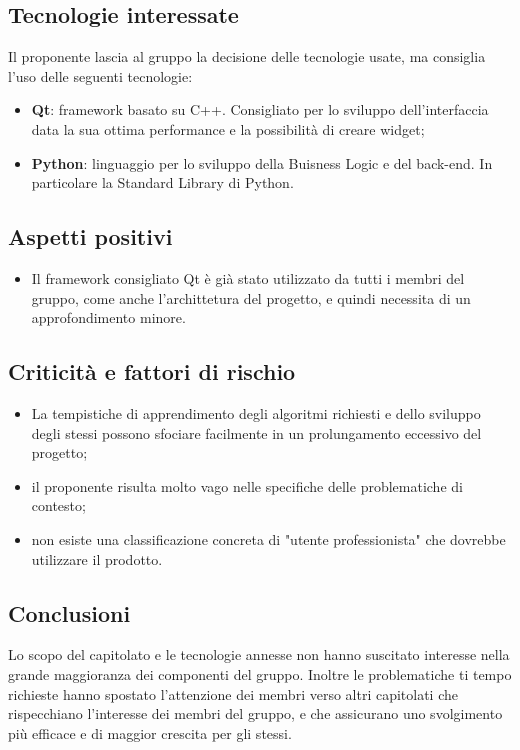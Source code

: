 \subsection{Tecnologie interessate}
Il proponente lascia al gruppo la decisione delle tecnologie usate, ma consiglia l'uso delle seguenti tecnologie:
\begin{itemize}
    \item \textbf{Qt}: framework basato su C++. Consigliato per lo sviluppo dell'interfaccia data la sua ottima performance e la possibilità di creare widget;
    \item \textbf{Python}: linguaggio per lo sviluppo della Buisness Logic e del back-end. In particolare la Standard Library di Python.
\end{itemize}
\subsection{Aspetti positivi}
\begin{itemize}
    \item Il framework consigliato Qt è già stato utilizzato da tutti i membri del gruppo, come anche l'archittetura del progetto, e quindi necessita di un approfondimento minore.
\end{itemize}
\subsection{Criticità e fattori di rischio}
\begin{itemize}
    \item La tempistiche di apprendimento degli algoritmi richiesti e dello sviluppo degli stessi possono sfociare facilmente in un prolungamento eccessivo del progetto;
    \item il proponente risulta molto vago nelle specifiche delle problematiche di contesto;
    \item non esiste una classificazione concreta di "utente professionista" che dovrebbe utilizzare il prodotto.
\end{itemize}
\subsection{Conclusioni}
Lo scopo del capitolato e le tecnologie annesse non hanno suscitato interesse nella grande maggioranza dei componenti del gruppo. Inoltre le problematiche ti tempo richieste hanno spostato l'attenzione dei membri verso altri capitolati che rispecchiano l'interesse dei membri del gruppo, e che assicurano uno svolgimento più efficace e di maggior crescita per gli stessi.
